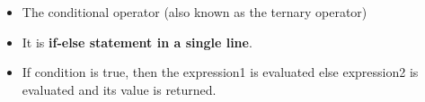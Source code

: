 
\begin{flushleft}
	
	\begin{itemize}
		\item The conditional operator (also known as the ternary operator)
		\item It is \textbf{if-else statement in a single line}. 
		\bigskip
		
		\item If condition is true, then the expression1 is evaluated else expression2 is evaluated and its value is returned.
		\bigskip
		
	\end{itemize}
	
	
	
	
\end{flushleft}
